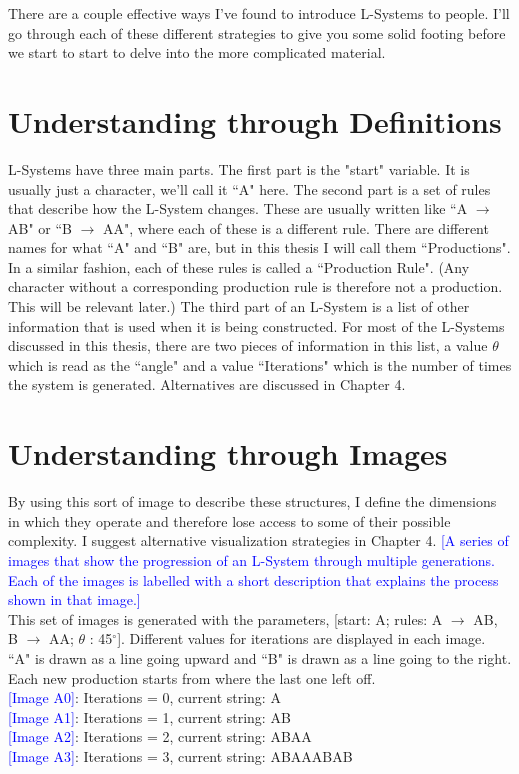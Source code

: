 \documentclass[12pt,twoside]{reedthesis}
\begin{document}
There are a couple effective ways I've found to introduce L-Systems to people. I'll go through each of these different strategies to give you some solid footing before we start to start to delve into the more complicated material. 


\section{Understanding through Definitions}

L-Systems have three main parts. The first part is the "start" variable. It is usually just a character, we'll call it ``A" here. The second part is a set of rules that describe how the L-System changes. These are usually written like ``A $\rightarrow$ AB" or ``B $\rightarrow$ AA", where each of these is a different rule. There are different names for what ``A" and ``B" are, but in this thesis I will call them ``Productions". In a similar fashion, each of these rules is called a ``Production Rule". (Any character without a corresponding production rule is therefore not a production. This will be relevant later.) The third part of an L-System is a list of other information that is used when it is being constructed. For most of the L-Systems discussed in this thesis, there are two pieces of information in this list, a value $\theta$ which is read as the ``angle" and a value ``Iterations" which is the number of times the system is generated. Alternatives are discussed in Chapter 4. 


\section{Understanding through Images}
By using this sort of image to describe these structures, I define the dimensions in which they operate and therefore lose access to some of their possible complexity. I suggest alternative visualization strategies in Chapter 4.
\textcolor{blue}{[A series of images that show the progression of an L-System through multiple generations. Each of the images is labelled with a short description that explains the process shown in that image.]}\\

This set of images is generated with the parameters, [start: A; rules: A $\rightarrow$ AB, B $\rightarrow$ AA; $\theta$ : 45$^{\circ}$]. Different values for iterations are displayed in each image. ``A" is drawn as a line going upward and ``B" is drawn as a line going to the right. Each new production starts from where the last one left off. 
\\\textcolor{blue}{[Image A0]}: Iterations = 0, current string: A
\\\textcolor{blue}{[Image A1]}: Iterations = 1, current string: AB
\\\textcolor{blue}{[Image A2]}: Iterations = 2, current string: ABAA
\\\textcolor{blue}{[Image A3]}: Iterations = 3, current string: ABAAABAB \\
\end{document}
